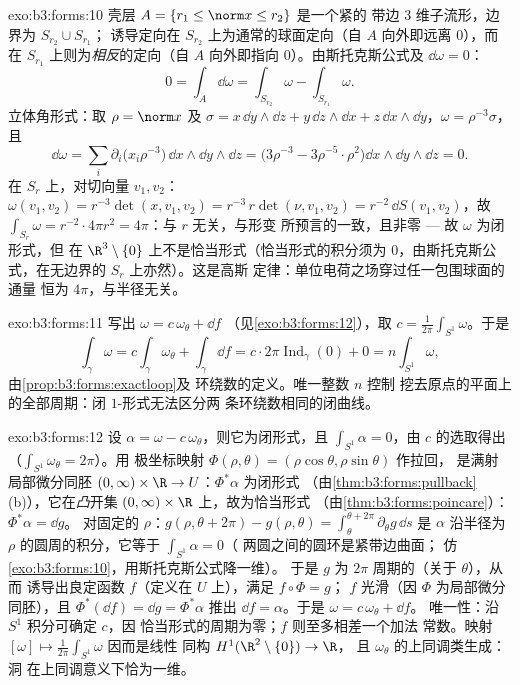 \begin{solution}{exo:b3:forms:10}
壳层 $A = \{r_1 \leq \norm x \leq r_2\}$ 是一个紧的
带边 $3$ 维子流形，边界为 $S_{r_2}\cup S_{r_1}$；
诱导定向在
$S_{r_2}$ 上为通常的球面定向（自 $A$ 向外即远离 $0$），而在
$S_{r_1}$ 上则为\emph{相反}的定向（自 $A$ 向外即指向
$0$）。由斯托克斯公式及 $\dd\omega = 0$：
\[
0 = \int_A\dd\omega = \int_{S_{r_2}}\omega -
\int_{S_{r_1}}\omega .
\]
立体角形式：取 $\rho = \norm x$ 及 $\sigma =
x\,\dd y\wedge\dd z + y\,\dd z\wedge\dd x + z\,\dd
x\wedge\dd y$，$\omega = \rho^{-3}\sigma$，且
\[
\dd\omega = \sum_i\partial_i\bigl(x_i\rho^{-3}\bigr)\,
\dd x\wedge\dd y\wedge\dd z
= \bigl(3\rho^{-3} - 3\rho^{-5}\cdot\rho^2\bigr)\dd
x\wedge\dd y\wedge\dd z = 0 .
\]
在 $S_r$ 上，对切向量 $v_1, v_2$：$\omega(v_1, v_2) =
r^{-3}\det(x, v_1, v_2) = r^{-3}\,r\det(\nu, v_1, v_2) =
r^{-2}\,\dd S(v_1, v_2)$，故 $\int_{S_r}\omega =
r^{-2}\cdot4\pi r^2 = 4\pi$：与 $r$ 无关，与形变
所预言的一致，且非零 --- 故 $\omega$ 为闭形式，但
在 $\R^3\setminus\{0\}$ 上不是恰当形式（恰当形式的积分须为
$0$，由斯托克斯公式，在无边界的 $S_r$ 上亦然）。这是高斯
定律：单位电荷之场穿过任一包围球面的通量
恒为 $4\pi$，与半径无关。
\end{solution}

\begin{solution}{exo:b3:forms:11}
写出 $\omega = c\,\omega_\theta + \dd f$
（见\cref{exo:b3:forms:12}），取 $c =
\frac1{2\pi}\int_{S^1}\omega$。于是
\[
\int_\gamma\omega = c\int_\gamma\omega_\theta +
\int_\gamma\dd f
= c\cdot2\pi\operatorname{Ind}_\gamma(0) + 0
= n\int_{S^1}\omega,
\]
由\cref{prop:b3:forms:exactloop}及
环绕数的定义。唯一整数 $n$ 控制
挖去原点的平面上的全部周期：闭 $1$-形式无法区分两
条环绕数相同的闭曲线。
\end{solution}

\begin{solution}{exo:b3:forms:12}
设 $\alpha = \omega - c\,\omega_\theta$，则它为闭形式，且
$\int_{S^1}\alpha = 0$，由 $c$ 的选取得出
（$\int_{S^1}\omega_\theta = 2\pi$）。用
极坐标映射 $\Phi(\rho, \theta) = (\rho\cos\theta, \rho\sin\theta)$ 作拉回，
是满射局部微分同胚 $(0, \infty)\times\R \to
U$：$\Phi^*\alpha$ 为闭形式
（由\cref{thm:b3:forms:pullback}(b)），它在\emph{凸}开集
$(0,\infty)\times\R$ 上，故为恰当形式
（由\cref{thm:b3:forms:poincare}）：$\Phi^*\alpha = \dd g$。
对固定的 $\rho$：$g(\rho, \theta + 2\pi) - g(\rho, \theta)
= \int_\theta^{\theta + 2\pi}\partial_\theta g\,\dd s$ 是
$\alpha$ 沿半径为
$\rho$ 的圆周的积分，它等于 $\int_{S^1}\alpha = 0$（
两圆之间的圆环是紧带边曲面；
仿\cref{exo:b3:forms:10}，用斯托克斯公式降一维）。
于是 $g$ 为 $2\pi$ 周期的（关于 $\theta$），从而
诱导出良定函数 $f$（定义在 $U$ 上），满足 $f\circ\Phi = g$；
$f$ 光滑（因 $\Phi$ 为局部微分同胚），且
$\Phi^*(\dd f) = \dd g = \Phi^*\alpha$ 推出 $\dd f =
\alpha$。于是 $\omega = c\,\omega_\theta + \dd f$。
唯一性：沿 $S^1$ 积分可确定 $c$，因
恰当形式的周期为零；$f$ 则至多相差一个加法
常数。映射 $[\omega] \mapsto
\frac1{2\pi}\int_{S^1}\omega$ 因而是线性
同构 $H^1(\R^2\setminus\{0\}) \to \R$，
且 $\omega_\theta$ 的上同调类生成：洞
在上同调意义下恰为一维。
\end{solution}

